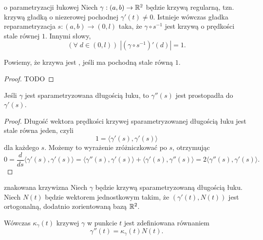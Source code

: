\begin{lemma}{o parametryzacji łukowej}{}
  Niech $\gamma:(a,b)\to\mathbb{R}^2$ będzie krzywą regularną, tzn. krzywą gładką o niezerowej pochodnej $\gamma'(t)\neq0$. Istnieje wówczas gładka reparametryzacja $s:(a,b)\to(0,l)$ taka, że $\gamma\circ s^{-1}$ jest krzywą o prędkości stale równej $1$. Innymi słowy,
  $$(\forall\;d\in (0,l))\;|(\gamma\circ s^{-1})'(d)|=1.$$
\end{lemma}

Powiemy, że krzywa jest , jeśli ma pochodną stale równą $1$.

\begin{proof}TODO
\end{proof}

\begin{fact}{}{}
  Jeśli $\gamma$ jest sparametryzowana długością łuku, to $\gamma''(s)$ jest prostopadła do $\gamma'(s)$.
\end{fact}

\begin{proof}
  Długość wektora prędkości krzywej sparametryzowanej długością łuku jest stale równa jeden, czyli
  $$1=\langle \gamma'(s),\gamma'(s)\rangle$$
  dla każdego $s$. Możemy to wyrażenie zróżniczkować po $s$, otrzymując
  $$0=\frac{d}{ds}\langle \gamma'(s),\gamma'(s)\rangle=\langle \gamma''(s),\gamma'(s)\rangle+\langle \gamma'(s),\gamma''(s)\rangle=2\langle\gamma''(s), \gamma'(s)\rangle.$$
\end{proof}

\begin{definition}{znakowana krzywizna}{}
  Niech $\gamma$ będzie krzywą sparametryzowaną długością łuku. Niech $N(t)$ będzie wektorem jednostkowym takim, że $(\gamma'(t), N(t))$ jest ortogonalną, dodatnio zorientowaną bazą $\mathbb{R}^2$.
  \begin{center}
  \end{center}

  Wówczas  $\kappa_\gamma(t)$ krzywej $\gamma$ w punkcie $t$ jest zdefiniowana równaniem
  $$\gamma''(t)=\kappa_\gamma(t)N(t).$$
\end{definition}

